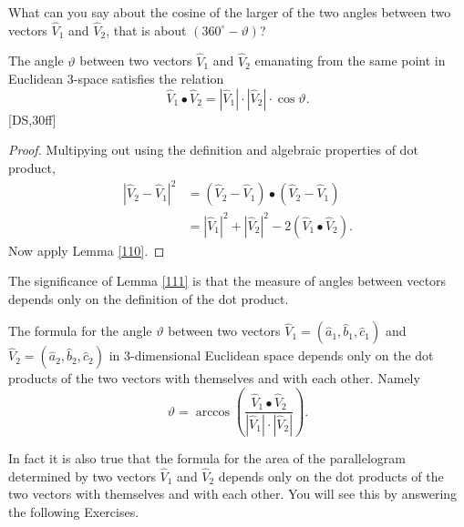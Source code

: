 \documentclass{ximera}
\begin{document}
\begin{exercise}
What can you say about the cosine of the larger of the two angles between two
vectors $\hat{V}_{1}$ and $\hat{V}_{2}$, that is about $\left(  360^{\circ
}-\vartheta\right)  $?
\end{exercise}

\begin{lemma}
\label{111}The angle $\vartheta$ between two vectors $\hat{V}_{1}$ and
$\hat{V}_{2}$ emanating from the same point in Euclidean $3$-space satisfies
the relation
\begin{equation}
\hat{V}_{1}\bullet\hat{V}_{2}=\left\vert \hat{V}_{1}\right\vert \cdot
\left\vert \hat{V}_{2}\right\vert \cdot\cos\vartheta. \label{2}%
\end{equation}
[DS,30ff]
\end{lemma}

\begin{proof}
Multipying out using the definition and algebraic properties of dot product,%
\begin{align*}
\left\vert \hat{V}_{2}-\hat{V}_{1}\right\vert ^{2}  &  =\left(  \hat{V}%
_{2}-\hat{V}_{1}\right)  \bullet\left(  \hat{V}_{2}-\hat{V}_{1}\right) \\
&  =\left\vert \hat{V}_{1}\right\vert ^{2}+\left\vert \hat{V}_{2}\right\vert
^{2}-2\left(  \hat{V}_{1}\bullet\hat{V}_{2}\right)  .
\end{align*}
Now apply Lemma \ref{110}.
\end{proof}

The significance of Lemma \ref{111} is that the measure of angles between
vectors depends only on the definition of the dot product.

\begin{corollary}
The formula for the angle $\vartheta$ between two vectors $\hat{V}_{1}=\left(
\hat{a}_{1},\hat{b}_{1},\hat{c}_{1}\right)  $ and $\hat{V}_{2}=\left(  \hat
{a}_{2},\hat{b}_{2},\hat{c}_{2}\right)  $ in $3$-dimensional Euclidean space
depends only on the dot products of the two vectors with themselves and with
each other. Namely%
\[
\vartheta=\arccos\left(  \frac{\hat{V}_{1}\bullet\hat{V}_{2}%
}{\left\vert \hat{V}_{1}\right\vert \cdot\left\vert \hat{V}_{2}\right\vert
}\right)  .
\]

\end{corollary}

In fact it is also true that the formula for the area of the parallelogram
determined by two vectors $\hat{V}_{1}$ and $\hat{V}_{2}$ depends only on the
dot products of the two vectors with themselves and with each other. You will
see this by answering the following Exercises.
\end{document}
